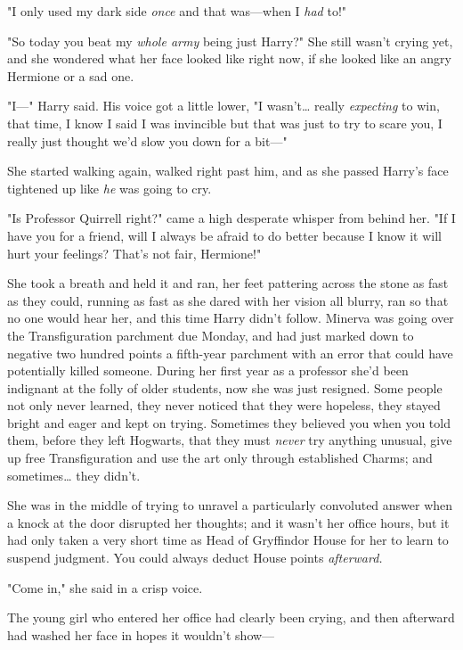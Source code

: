 "I only used my dark side \emph{once} and that was---when I \emph{had} to!"

"So today you beat my \emph{whole army} being just Harry?" She still wasn't 
crying yet, and she wondered what her face looked like right now, if she looked 
like an angry Hermione or a sad one.

"I---" Harry said. His voice got a little lower, "I wasn't{\ldots} really 
\emph{expecting} to win, that time, I know I said I was invincible but that was 
just to try to scare you, I really just thought we'd slow you down for a bit---"

She started walking again, walked right past him, and as she passed Harry's 
face tightened up like \emph{he} was going to cry.

"Is Professor Quirrell right?" came a high desperate whisper from behind her. 
"If I have you for a friend, will I always be afraid to do better because I 
know it will hurt your feelings? That's not fair, Hermione!"

She took a breath and held it and ran, her feet pattering across the stone as 
fast as they could, running as fast as she dared with her vision all blurry, 
ran so that no one would hear her, and this time Harry didn't follow.
\sbreak
Minerva was going over the Transfiguration parchment due Monday, and had just 
marked down to negative two hundred points a fifth-year parchment with an error 
that could have potentially killed someone. During her first year as a 
professor she'd been indignant at the folly of older students, now she was just 
resigned. Some people not only never learned, they never noticed that they were 
hopeless, they stayed bright and eager and kept on trying. Sometimes they 
believed you when you told them, before they left Hogwarts, that they must 
\emph{never} try anything unusual, give up free Transfiguration and use the art 
only through established Charms; and sometimes{\ldots} they didn't.

She was in the middle of trying to unravel a particularly convoluted answer 
when a knock at the door disrupted her thoughts; and it wasn't her office 
hours, but it had only taken a very short time as Head of Gryffindor House for 
her to learn to suspend judgment. You could always deduct House points 
\emph{afterward.}

"Come in," she said in a crisp voice.

The young girl who entered her office had clearly been crying, and then 
afterward had washed her face in hopes it wouldn't show---

